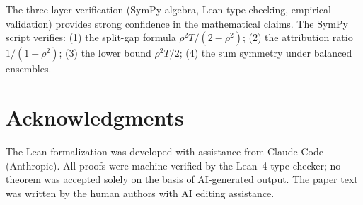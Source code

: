 \documentclass{article}
\begin{document}
The three-layer verification (SymPy algebra, Lean type-checking, empirical validation) provides strong confidence in the mathematical claims. The SymPy script verifies: (1) the split-gap formula $\rho^2 T/(2-\rho^2)$; (2) the attribution ratio $1/(1-\rho^2)$; (3) the lower bound $\rho^2 T/2$; (4) the sum symmetry under balanced ensembles.

\section*{Acknowledgments}
The Lean formalization was developed with assistance from Claude Code (Anthropic). All proofs were machine-verified by the Lean~4 type-checker; no theorem was accepted solely on the basis of AI-generated output. The paper text was written by the human authors with AI editing assistance.



\end{document}
